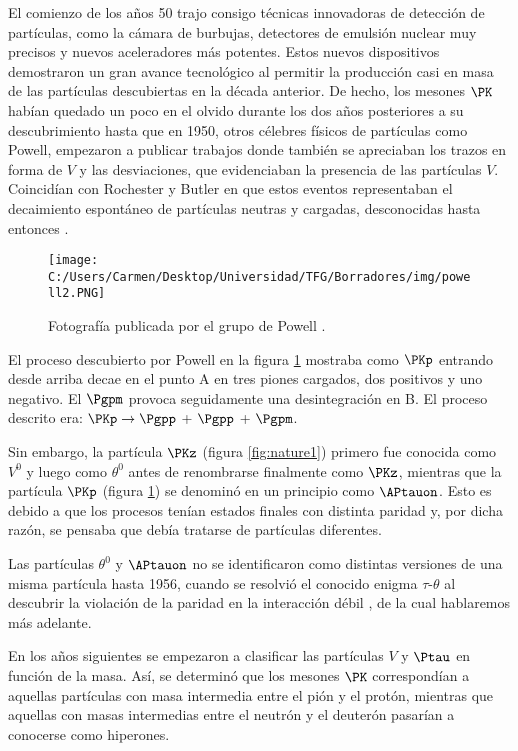 El comienzo de los años 50 trajo consigo técnicas innovadoras de detección de partículas, como la cámara de burbujas, detectores de emulsión nuclear muy precisos y nuevos aceleradores más potentes. Estos nuevos dispositivos demostraron un gran avance tecnológico al permitir la producción casi en masa de las partículas descubiertas en la década anterior. De hecho, los mesones $\PK$ habían quedado un poco en el olvido durante los dos años posteriores a su descubrimiento hasta que en 1950, otros célebres físicos de partículas como Powell, empezaron a publicar trabajos donde también se apreciaban los trazos en forma de $V$ y las desviaciones, que evidenciaban la presencia de las partículas $V$. Coincidían con Rochester y Butler en que estos eventos representaban el decaimiento espontáneo de partículas neutras y cargadas, desconocidas hasta entonces \cite{Pais}. 

\begin{figure}[h!]
	\centering
	\texttt{[image: C:/Users/Carmen/Desktop/Universidad/TFG/Borradores/img/powell2.PNG]}
	\caption[Fotografía de Powell mostrando una desviación en la trayectoria]
	{Fotografía publicada por el grupo de Powell \cite{Griffiths2008}.}
	\label{fig:powell}
\end{figure}

El proceso descubierto por Powell en la figura \ref{fig:powell} mostraba como $\PKp$ entrando desde arriba decae en el punto A en tres piones cargados, dos positivos y uno negativo. El $\Pgpm$ provoca seguidamente una desintegración en B. El proceso descrito era: $\PKp \rightarrow \Pgpp$ + $\Pgpp$ +  $\Pgpm$.

Sin embargo, la partícula $\PKz$ (figura \ref{fig:nature1}) primero fue conocida como $V^0$ y luego como $\theta^0$ antes de renombrarse finalmente como $\PKz$, mientras que la partícula $\PKp$ (figura \ref{fig:powell}) se denominó en un principio como $\APtauon$. Esto es debido a que los procesos tenían estados finales con distinta paridad y, por dicha razón, se pensaba que debía tratarse de partículas diferentes.

Las partículas $\theta^0$ y $\APtauon$ no se identificaron como distintas versiones de una misma partícula hasta 1956, cuando se resolvió el conocido enigma $\tau$-$\theta$ al descubrir la violación de la paridad en la interacción débil \cite{Lee}, de la cual hablaremos más adelante. 

En los años siguientes se empezaron a clasificar las partículas $V$ y $\Ptau$ en función de la masa. Así, se determinó que los mesones $\PK$ correspondían a aquellas partículas con masa intermedia entre el pión y el protón, mientras que aquellas con masas intermedias entre el neutrón y el deuterón pasarían a conocerse como hiperones. 

